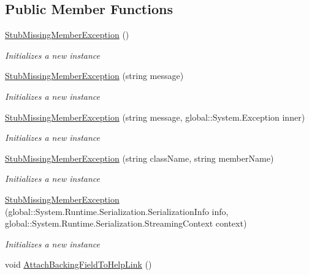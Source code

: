 \subsection*{Public Member Functions}
\begin{DoxyCompactItemize}
\item 
\hyperlink{class_system_1_1_fakes_1_1_stub_missing_member_exception_a0f3c11d9ccb73ae9472227593e7985b9}{Stub\-Missing\-Member\-Exception} ()
\begin{DoxyCompactList}\small\item\em Initializes a new instance\end{DoxyCompactList}\item 
\hyperlink{class_system_1_1_fakes_1_1_stub_missing_member_exception_a178ffdbaa2cbfe5806447b1bfb43c8a5}{Stub\-Missing\-Member\-Exception} (string message)
\begin{DoxyCompactList}\small\item\em Initializes a new instance\end{DoxyCompactList}\item 
\hyperlink{class_system_1_1_fakes_1_1_stub_missing_member_exception_a054bb05445990f99c9f689d5e90322be}{Stub\-Missing\-Member\-Exception} (string message, global\-::\-System.\-Exception inner)
\begin{DoxyCompactList}\small\item\em Initializes a new instance\end{DoxyCompactList}\item 
\hyperlink{class_system_1_1_fakes_1_1_stub_missing_member_exception_abe217cb35625a7c78283ce2a5bbc7e18}{Stub\-Missing\-Member\-Exception} (string class\-Name, string member\-Name)
\begin{DoxyCompactList}\small\item\em Initializes a new instance\end{DoxyCompactList}\item 
\hyperlink{class_system_1_1_fakes_1_1_stub_missing_member_exception_aca5e1cbaae47d9e885f85a54032f2092}{Stub\-Missing\-Member\-Exception} (global\-::\-System.\-Runtime.\-Serialization.\-Serialization\-Info info, global\-::\-System.\-Runtime.\-Serialization.\-Streaming\-Context context)
\begin{DoxyCompactList}\small\item\em Initializes a new instance\end{DoxyCompactList}\item 
void \hyperlink{class_system_1_1_fakes_1_1_stub_missing_member_exception_a49d5ddf5a810cd75e871d162f66758aa}{Attach\-Backing\-Field\-To\-Help\-Link} ()

\end{DoxyCompactItemize}
